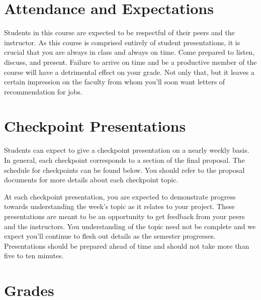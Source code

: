 \documentclass[10pt]{article}
\begin{document}
\section{Attendance and Expectations}

Students in this course are expected to be respectful of their peers and the instructor. As this course is comprised entirely of student presentations, it is crucial that you are always in class and always on time.  Come prepared to listen, discuss, and present.  Failure to arrive on time and be a productive member of the course will have a detrimental effect on your grade.  Not only that, but it leaves a certain impression on the faculty from whom you'll soon want letters of recommendation for jobs.  

\section{Checkpoint Presentations}

Students can expect to give a checkpoint presentation on a nearly weekly basis. In general, each checkpoint corresponds to a section of the final proposal. The schedule for checkpoints can be found below. You should refer to the proposal documents for more details about each checkpoint topic. 

At each checkpoint presentation, you are expected to demonstrate progress towards understanding the week's topic as it relates to your project.  These presentations are meant to be an opportunity to get feedback from your peers and the instructors.  You understanding of the topic need not be complete and we expect you'll continue to flesh out details as the semester progresses.  Presentations should be prepared ahead of time and should not take more than five to ten minutes. 

\section{Grades}
\end{document}
